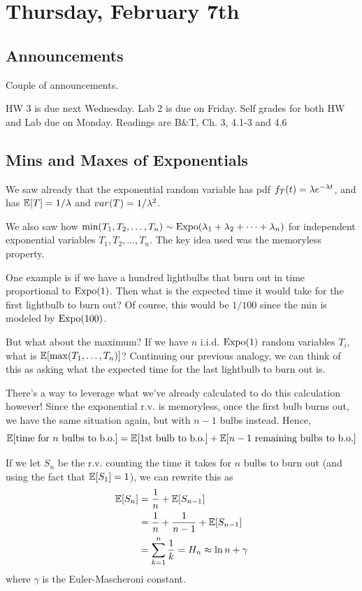 \documentclass[11 pt]{scrartcl}
\begin{document}
\section{Thursday, February 7th}
\subsection{Announcements}
Couple of announcements. 
\begin{itemize}
    \ii HW 3 is due next Wednesday. 
    \ii Lab 2 is due on Friday. 
    \ii Self grades for both HW and Lab due on Monday. 
    \ii Readings are B\&T, Ch. 3, 4.1-3 and 4.6 
\end{itemize}

\subsection{Mins and Maxes of Exponentials}
We saw already that the exponential random variable has pdf $f_T(t) = \lambda e^{-\lambda t}$, and has $\mathbb E[T] = 1/\lambda$ and $var(T) = 1/\lambda^2$. 

We also saw how $\min(T_1, T_2, \dots, T_n) \sim \text{Expo}(\lambda_1+\lambda_2 + \dots + \lambda_n)$ for independent exponential variables $T_1, T_2, \dots, T_n$. The key idea used was the memoryless property. 

One example is if we have a hundred lightbulbs that burn out in time proportional to $\text{Expo}(1)$. Then what is the expected time it would take for the first lightbulb to burn out? Of course, this would be $1/100$ since the min is modeled by $\text{Expo}(100)$. 

But what about the maximum? If we have $n$ i.i.d. $\text{Expo}(1)$ random variables $T_i$, what is $\mathbb E[\max(T_1, \dots, T_n)]$? Continuing our previous analogy, we can think of this as asking what the expected time for the last lightbulb to burn out is. 

There's a way to leverage what we've already calculated to do this calculation however! Since the exponential r.v. is memoryless, once the first bulb burns out, we have the same situation again, but with $n-1$ bulbs instead. Hence,   
\[ \mathbb E[\text{time for }n\text{ bulbs to b.o.}] = \mathbb E[\text{1st bulb to b.o.}] + \mathbb E[n-1\text{ remaining bulbs to b.o.}]\]

If we let $S_n$ be the r.v. counting the time it takes for $n$ bulbs to burn out (and using the fact that $\mathbb E[S_1] = 1$), we can rewrite this as 
\begin{align*}
    \mathbb E[S_n] &= \dfrac{1}{n} + \mathbb E[S_{n-1}] \\ 
             &= \dfrac{1}{n} + \dfrac{1}{n-1} + \mathbb E[S_{n-1}] \\ 
             &= \sum_{k=1}^n \dfrac{1}{k} = H_n \approx \ln n + \gamma 
\end{align*}
where $\gamma$ is the Euler-Mascheroni constant. 
\end{document}
